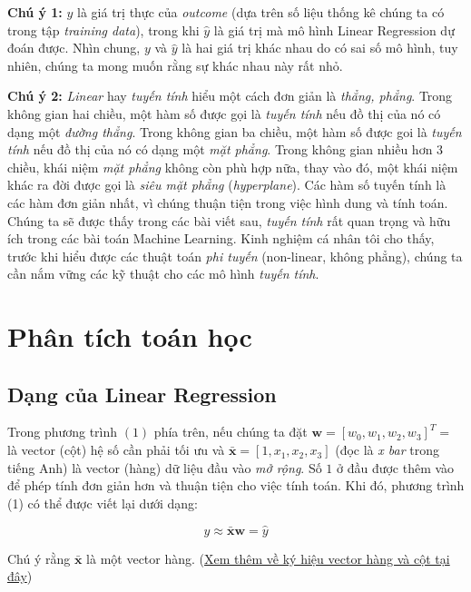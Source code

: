\textbf{Chú ý 1:} $y$ là giá trị thực của \textit{outcome} (dựa trên số liệu thống kê chúng ta có trong tập \textit{training data}), trong khi $\hat{y}$ là giá trị mà mô hình Linear Regression dự đoán được. Nhìn chung, $y$ và $\hat{y}$ là hai giá trị khác nhau do có sai số mô hình, tuy nhiên, chúng ta mong muốn rằng sự khác nhau này rất nhỏ. 
 
\textbf{Chú ý 2:} \textit{Linear} hay \textit{tuyến tính} hiểu một cách đơn giản là \textit{thẳng, phẳng}. Trong không gian hai chiều, một hàm số được gọi là \textit{tuyến tính} nếu đồ thị của nó có dạng một \textit{đường thẳng}. Trong không gian ba chiều, một hàm số được goi là \textit{tuyến tính} nếu đồ thị của nó có dạng một \textit{mặt phẳng}. Trong không gian nhiều hơn 3 chiều, khái niệm \textit{mặt phẳng} không còn phù hợp nữa, thay vào đó, một khái niệm khác ra đời được gọi là \textit{siêu mặt phẳng} (\textit{hyperplane}). Các hàm số tuyến tính là các hàm đơn giản nhất, vì chúng thuận tiện trong việc hình dung và tính toán. Chúng ta sẽ được thấy trong các bài viết sau, \textit{tuyến tính} rất quan trọng và hữu ích trong các bài toán Machine Learning. Kinh nghiệm cá nhân tôi cho thấy, trước khi hiểu được các thuật toán \textit{phi tuyến} (non-linear, không phẳng), chúng ta cần nắm vững các kỹ thuật cho các mô hình \textit{tuyến tính}. 
 
 
 
 
 
\section{Phân tích toán học}
 
 
 
 
\subsection{Dạng của Linear Regression }
 
Trong phương trình $(1)$ phía trên, nếu chúng ta đặt $\mathbf{w} = [w_0, w_1, w_2, w_3]^T = $ là vector (cột) hệ số cần phải tối ưu và $\mathbf{\bar{x}} = [1, x_1, x_2, x_3]$ (đọc là \textit{x bar} trong tiếng Anh) là vector (hàng) dữ liệu đầu vào \textit{mở rộng}. Số $1$ ở đầu được thêm vào để phép tính đơn giản hơn và thuận tiện cho việc tính toán. Khi đó, phương trình (1) có thể được viết lại dưới dạng: 
 
$$y \approx \mathbf{\bar{x}}\mathbf{w} = \hat{y}$$ 
 
Chú ý rằng $\mathbf{\bar{x}}$ là một vector hàng. (\href{http://machinelearningcoban.com/math/#luu-y-ve-ky-hieu}{Xem thêm về ký hiệu vector hàng và cột tại đây}) 
 
